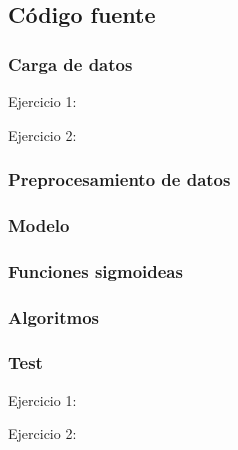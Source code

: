 \documentclass[10pt, a4paper, spanish]{article}
\begin{document}

\newpage
 
%

\subsection{Código fuente}

\subsubsection*{Carga de datos}

Ejercicio 1:



Ejercicio 2:



\subsubsection*{Preprocesamiento de datos}



\subsubsection*{Modelo}





\subsubsection*{Funciones sigmoideas}



\subsubsection*{Algoritmos}



\subsubsection*{Test}

Ejercicio 1:





Ejercicio 2:


\end{document}
